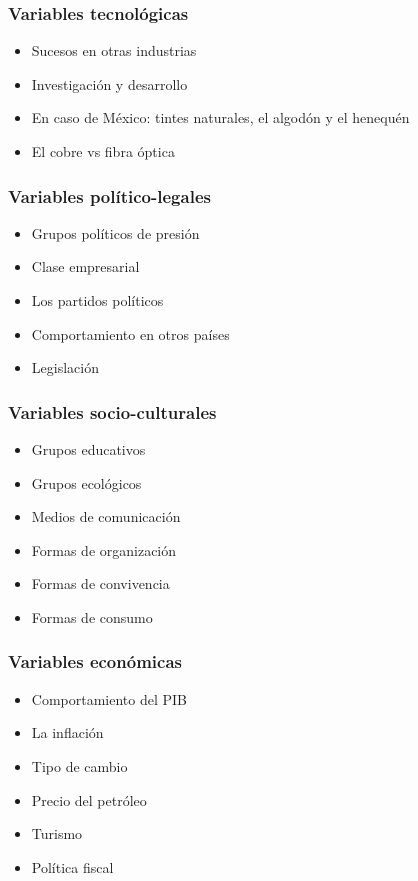 \subsubsection{Variables tecnológicas}
\begin{itemize}
    \item Sucesos en otras industrias
    \item Investigación y desarrollo
    \item En caso de México: tintes naturales, el algodón y el henequén
    \item El cobre vs fibra óptica
\end{itemize}
\subsubsection{Variables político-legales}
\begin{itemize}
    \item Grupos políticos de presión
    \item Clase empresarial
    \item Los partidos políticos
    \item Comportamiento en otros países
    \item Legislación
\end{itemize}
\subsubsection{Variables socio-culturales}
\begin{itemize}
    \item Grupos educativos
    \item Grupos ecológicos
    \item Medios de comunicación
    \item Formas de organización
    \item Formas de convivencia
    \item Formas de consumo
\end{itemize}
\subsubsection{Variables económicas}
\begin{itemize}
    \item Comportamiento del PIB
    \item La inflación 
    \item Tipo de cambio
    \item Precio del petróleo
    \item Turismo
    \item Política fiscal
\end{itemize}
